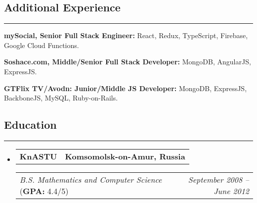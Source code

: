 \documentclass[11pt,letterpaper]{article}
\makeatletter
\newcommand{\headerrow}[2]
{\begin{tabular*}{\linewidth}{l@{\extracolsep{\fill}}r}
#1 &
#2 \\
\end{tabular*}}
\makeatother
\begin{document}
\renewcommand\labelitemi{$\bullet$}


\subsection*{\Large Additional Experience}
\vspace{-.5em}
\hrule
\vspace{1em}
\begin{itemize*}
	\item \textbf{mySocial, Senior Full Stack Engineer:} React, Redux, TypeScript, Firebase, Google Cloud Functions.
	\item \textbf{Soshace.com, Middle/Senior Full Stack Developer:} MongoDB, AngularJS, ExpressJS.
	\item \textbf{GTFlix TV/Avodn: Junior/Middle JS Developer:} MongoDB, ExpressJS, BackboneJS, MySQL, Ruby-on-Rails.
\end{itemize*}

\subsection*{\Large Education}
\vspace{-.5em}
\hrule
\vspace{1em}

\begin{itemize}[leftmargin=1em]
	\parskip=0.1em
		
	\item
	      \headerrow
	      {\textbf{KnASTU}}
	      {\textbf{Komsomolsk-on-Amur, Russia}}
	      \headerrow
	      {\emph{B.S. Mathematics and Computer Science} (\textbf{GPA:} 4.4/5)}
	      {\emph{September 2008 -- June 2012}}
	      	      
\end{itemize}
\end{document}
